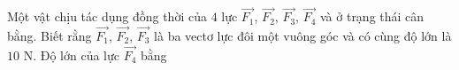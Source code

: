 \begin{ex}
Một vật chịu tác dụng đồng thời của $4$ lực $\overrightarrow{F_1}$, $\overrightarrow{F_2}$, $\overrightarrow{F_3}$, $\overrightarrow{F_4}$ và ở trạng thái cân bằng. Biết rằng $\overrightarrow{F_1}$, $\overrightarrow{F_2}$, $\overrightarrow{F_3}$ là ba vectơ lực đôi một vuông góc và có cùng độ lớn là $10$ N. Độ lớn của lực $\overrightarrow{F_4}$ bằng
\end{ex}
